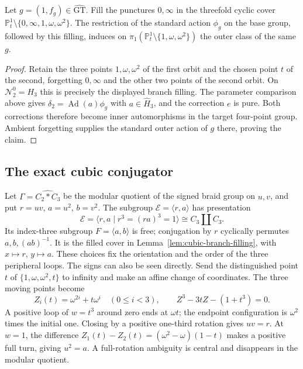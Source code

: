 \begin{lemma}\label{lem:cubic-branch-filling}
Let $g=(1,f_g)\in\widehat{\mathrm{GT}}$.
Fill the punctures $0,\infty$ in the threefold cyclic cover
$\mathbb P^1_t\setminus\{0,\infty,1,\omega,\omega^2\}$.
The restriction of the standard action $\phi_g$ on the
base group, followed by this filling, induces on
$\pi_1(\mathbb P^1_t\setminus\{1,\omega,\omega^2\})$
the outer class of the same $g$.
\end{lemma}
\begin{proof}
Retain the three points $1,\omega,\omega^2$ of the first
orbit and the chosen point $t$ of the second, forgetting
$0,\infty$ and the other two points of the second orbit.
On $\mathcal N_2^0=H_3$ this is precisely the displayed branch
filling. The parameter comparison above gives
$\delta_2=\operatorname{Ad}(a)\phi_g$ with
$a\in\widehat H_3$, and the correction $e$ is pure.
Both corrections therefore become inner automorphisms in
the target four-point group. Ambient forgetting supplies
the standard outer action of $g$ there, proving the claim.
\end{proof}

\subsection{The exact cubic conjugator}

Let $\Gamma=\widehat{C_2*C_3}$ be the modular quotient of
the signed braid group on $u,v$, and put $r=uv$,
$a=u^2$, $b=v^2$. The subgroup $\mathcal E=\langle r,a\rangle$
has presentation
\[
 \mathcal E=\langle r,a\mid r^3=(ra)^3=1\rangle
       \cong C_3\amalg C_3.
\]
Its index-three subgroup $F=\langle a,b\rangle$ is free;
conjugation by $r$ cyclically permutes $a,b,(ab)^{-1}$.
It is the filled cover in Lemma~\ref{lem:cubic-branch-filling},
with $x\mapsto r$, $y\mapsto a$. These choices fix the
orientation and the order of the three peripheral loops.
The signs can also be seen directly. Send the distinguished
point $t$ of $\{1,\omega,\omega^2,t\}$ to infinity and make an
affine change of coordinates. The three moving points become
\[
 Z_i(t)=\omega^{2i}+t\omega^i\quad(0\leq i<3),
 \qquad Z^3-3tZ-(1+t^3)=0.
\]
A positive loop of $w=t^3$ around zero ends at $\omega t$;
the endpoint configuration is $\omega^2$ times the initial
one. Closing by a positive one-third rotation gives $uv=r$.
At $w=1$, the difference
$Z_1(t)-Z_2(t)=(\omega^2-\omega)(1-t)$ makes a positive
full turn, giving $u^2=a$. A full-rotation ambiguity is central
and disappears in the modular quotient.

